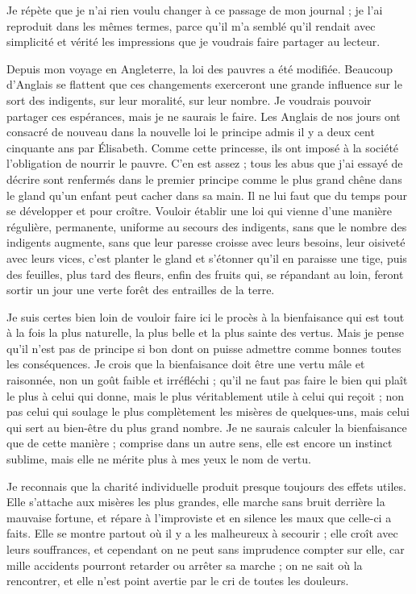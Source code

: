 \documentclass[french,twoside]{book} %
\begin{document}
\noindent Je répète que je n’ai rien voulu changer à ce passage de mon journal ; je l’ai reproduit dans les mêmes termes, parce qu’il m’a semblé qu’il rendait avec simplicité et vérité les impressions que je voudrais faire partager au lecteur.\par
Depuis mon voyage en Angleterre, la loi des pauvres a été modifiée. Beaucoup d’Anglais se flattent que ces changements exerceront une grande influence sur le sort des indigents, sur leur moralité, sur leur nombre. Je voudrais pouvoir partager ces espérances, mais je ne saurais le faire. Les Anglais de nos jours ont consacré de nouveau dans la nouvelle loi le principe admis il y a deux cent cinquante ans par Élisabeth. Comme cette princesse, ils ont imposé à la société l’obligation de nourrir le pauvre. C'en est assez ; tous les abus que j’ai essayé de décrire sont renfermés dans le premier principe comme le plus grand chêne dans le gland qu’un enfant peut cacher dans sa main. Il ne lui faut que du temps pour se développer et pour croître. Vouloir établir une loi qui vienne d’une manière régulière, permanente, uniforme au secours des indigents, sans que le nombre des indigents augmente, sans que leur paresse croisse avec leurs besoins, leur oisiveté avec leurs vices, c’est planter le gland et s’étonner qu’il en paraisse une tige, puis des feuilles, plus tard des fleurs, enfin des fruits qui, se répandant au loin, feront sortir un jour une verte forêt des entrailles de la terre.\par
\bigbreak
\noindent Je suis certes bien loin de vouloir faire ici le procès à la bienfaisance qui est tout à la fois la plus naturelle, la plus belle et la plus sainte des vertus. Mais je pense qu’il n’est pas de principe si bon dont on puisse admettre comme bonnes toutes les conséquences. Je crois que la bienfaisance doit être une vertu mâle et raisonnée, non un goût faible et irréfléchi ; qu’il ne faut pas faire le bien qui plaît le plus à celui qui donne, mais le plus véritablement utile à celui qui reçoit ; non pas celui qui soulage le plus complètement les misères de quelques-uns, mais celui qui sert au bien-être du plus grand nombre. Je ne saurais calculer la bienfaisance que de cette manière ; comprise dans un autre sens, elle est encore un instinct sublime, mais elle ne mérite plus à mes yeux le nom de vertu.\par
Je reconnais que la charité individuelle produit presque toujours des effets utiles. Elle s’attache aux misères les plus grandes, elle marche sans bruit derrière la mauvaise fortune, et répare à l’improviste et en silence les maux que celle-ci a faits. Elle se montre partout où il y a les malheureux à secourir ; elle croît avec leurs souffrances, et cependant on ne peut sans imprudence compter sur elle, car mille accidents pourront retarder ou arrêter sa marche ; on ne sait où la rencontrer, et elle n’est point avertie par le cri de toutes les douleurs.\par
\end{document}
